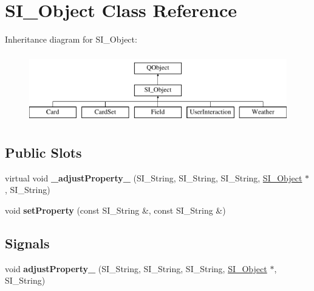 \hypertarget{class_s_i___object}{}\section{S\+I\+\_\+\+Object Class Reference}
\label{class_s_i___object}
Inheritance diagram for S\+I\+\_\+\+Object\+:\begin{figure}[H]
\begin{center}
\leavevmode
\includegraphics[height=3.000000cm]{class_s_i___object}
\end{center}
\end{figure}
\subsection*{Public Slots}
\begin{DoxyCompactItemize}
\item 
\mbox{\label{class_s_i___object_a9c997aa5f9bc1670872e7a59b3dddd93}} 
virtual void {\bfseries \+\_\+adjust\+Property\+\_\+} (S\+I\+\_\+\+String, S\+I\+\_\+\+String, S\+I\+\_\+\+String, \hyperlink{class_s_i___object}{S\+I\+\_\+\+Object} $\ast$, S\+I\+\_\+\+String)
\item 
\mbox{\label{class_s_i___object_afa18ebaf13b5ca5de7382ca0950b2016}} 
void {\bfseries set\+Property} (const S\+I\+\_\+\+String \&, const S\+I\+\_\+\+String \&)
\end{DoxyCompactItemize}
\subsection*{Signals}
\begin{DoxyCompactItemize}
\item 
\mbox{\label{class_s_i___object_acead0d8f20e267fc9c40cf865c975769}} 
void {\bfseries adjust\+Property\+\_\+} (S\+I\+\_\+\+String, S\+I\+\_\+\+String, S\+I\+\_\+\+String, \hyperlink{class_s_i___object}{S\+I\+\_\+\+Object} $\ast$, S\+I\+\_\+\+String)
\end{DoxyCompactItemize}
